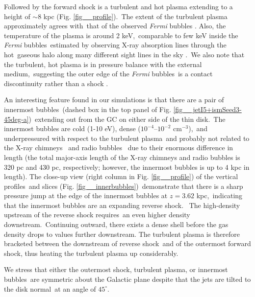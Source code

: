 \documentclass[fleqn,usenatbib,useAMS]{mnras}
\begin{document}
 Followed by the forward shock is a turbulent and hot plasma extending to a height of $\sim 8$ kpc (Fig. \ref{fig__profile}).\
 The extent of the turbulent plasma approximately agrees with\
 that of the observed \textit{Fermi} bubbles \citep{Su2010}.
 Also, the temperature of the plasma is around 2 keV,\
 comparable to few keV inside the \textit{Fermi} bubbles\
 estimated by observing X-ray absorption lines through the hot\
 gaseous halo along many different sight lines in the sky \citep{Miller_2013}.\
 We also note that the turbulent, hot plasma is in pressure balance with the external medium,\
 suggesting the outer edge of the \textit{Fermi} bubbles\
 is a contact discontinuity rather than a shock \citep{Zhang2020}.


 An interesting feature found in our simulations is that there are a pair of innermost bubbles\
 (dashed box in the top panel of Fig. \ref{fig__jetI5+ismSeed3-45deg-a})\
 extending out from the GC on either side of the thin disk.\
 The innermost bubbles are cold (1-10 eV), dense ($10^{-4}$--$10^{-2}$ cm$^{-3}$),\
 and underpressured with respect to the turbulent plasma\
 and probably not related to the X-ray chimneys \citep{Ponti2019}\
 and radio bubbles \citep{Heywood2019}\
 due to their enormous difference in length (the total major-axis length of the X-ray chimneys
 and radio bubbles is 320 pc and 430 pc, respectively; however, the innermost bubbles
 is up to 4 kpc in length).
 The close-up view (right column in Fig. \ref{fig__profile}) of the vertical profiles\
 and slices (Fig. \ref{fig__innerbubbles})\
 demonstrate that there is a sharp pressure jump at the edge of the innermost bubbles at $z=3.62$ kpc,\
 indicating that the innermost bubbles are an expanding reverse shock.\ %
 The high-density upstream of the reverse shock requires\
 an even higher density downstream.\
 Continuing outward, there exists a dense shell before the gas density drops to values further downstream.
 The turbulent plasma is therefore bracketed between the downstream of reverse shock\
 and of the outermost forward shock, thus heating the turbulent plasma up considerably.

 We stress that either the outermost shock, turbulent plasma, or innermost bubbles\
 are symmetric about the Galactic plane despite that the jets are tilted to the disk normal\
 at an angle of $45^{\circ}$.
\end{document}
